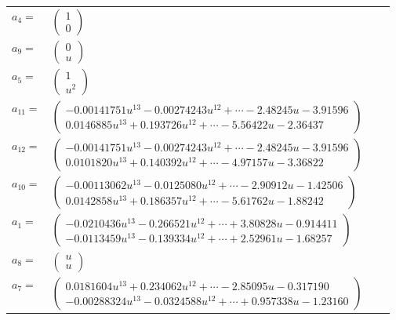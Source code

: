 \documentclass[1p]{elsarticle_modified}
\theoremstyle{definition}
\begin{document}
\begin{tabular}{m{7pt} m{180pt} m{7pt} m{180pt} }
\flushright $a_{4}=$&$\begin{pmatrix}1\\0\end{pmatrix}$ \\
\flushright $a_{9}=$&$\begin{pmatrix}0\\u\end{pmatrix}$ \\
\flushright $a_{5}=$&$\begin{pmatrix}1\\u^2\end{pmatrix}$ \\
\flushright $a_{11}=$&$\begin{pmatrix}-0.00141751 u^{13}-0.00274243 u^{12}+\cdots-2.48245 u-3.91596\\0.0146885 u^{13}+0.193726 u^{12}+\cdots-5.56422 u-2.36437\end{pmatrix}$ \\
\flushright $a_{12}=$&$\begin{pmatrix}-0.00141751 u^{13}-0.00274243 u^{12}+\cdots-2.48245 u-3.91596\\0.0101820 u^{13}+0.140392 u^{12}+\cdots-4.97157 u-3.36822\end{pmatrix}$ \\
\flushright $a_{10}=$&$\begin{pmatrix}-0.00113062 u^{13}-0.0125080 u^{12}+\cdots-2.90912 u-1.42506\\0.0142858 u^{13}+0.186357 u^{12}+\cdots-5.61762 u-1.88242\end{pmatrix}$ \\
\flushright $a_{1}=$&$\begin{pmatrix}-0.0210436 u^{13}-0.266521 u^{12}+\cdots+3.80828 u-0.914411\\-0.0113459 u^{13}-0.139334 u^{12}+\cdots+2.52961 u-1.68257\end{pmatrix}$ \\
\flushright $a_{8}=$&$\begin{pmatrix}u\\u\end{pmatrix}$ \\
\flushright $a_{7}=$&$\begin{pmatrix}0.0181604 u^{13}+0.234062 u^{12}+\cdots-2.85095 u-0.317190\\-0.00288324 u^{13}-0.0324588 u^{12}+\cdots+0.957338 u-1.23160\end{pmatrix}$ \\

\end{tabular}
\end{document}
